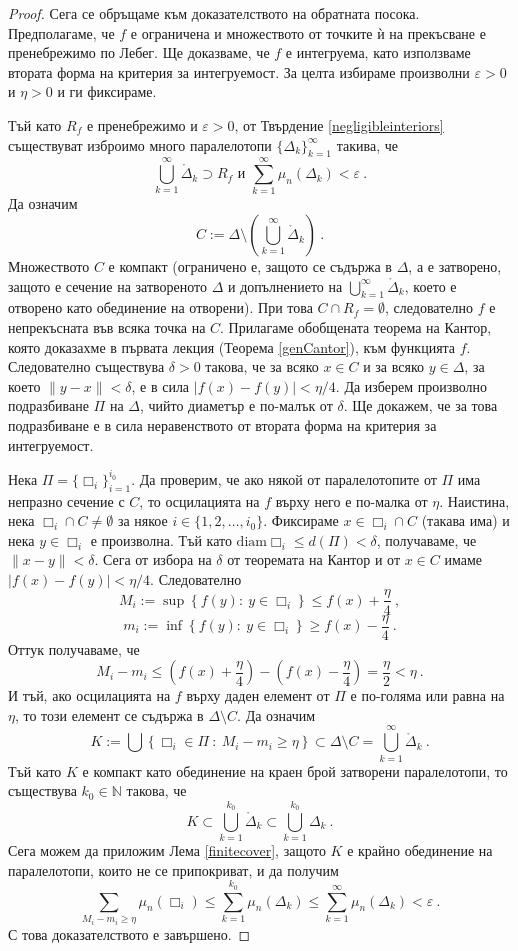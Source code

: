 \documentclass[11pt]{article}
\numberwithin{equation}{section}
\numberwithin{figure}{section}
\numberwithin{table}{section}
\theoremstyle{plain}
\theoremstyle{definition}
\theoremstyle{remark}
\theoremstyle{definition}
\theoremstyle{remark}
\theoremstyle{plain}
\theoremstyle{definition}
\theoremstyle{definition}
\theoremstyle{plain}
\theoremstyle{plain}
\theoremstyle{plain}
\theoremstyle{definition}
\theoremstyle{plain}
\newcommand*{\N}{\mathbb{N}}
\begin{document}
\begin{proof}
Сега се обръщаме към доказателството на обратната посока. Предполагаме, че $f$ е ограничена и множеството от точките \`{и} на прекъсване  е пренебрежимо по Лебег. Ще доказваме, че $f$ е интегруема, като използваме втората форма на критерия за интегруемост. За целта избираме произволни $\varepsilon>0$ и $\eta>0$ и ги фиксираме.

Тъй като $R_f$ е пренебрежимо и $\varepsilon>0$, от Твърдение \ref{negligibleinteriors} съществуват изброимо много паралелотопи $\{\Delta_k \}_{k=1}^\infty$ такива, че $$\bigcup_{k=1}^\infty \mathring\Delta_k \supset R_f  \mbox{ и } \sum_{k=1}^\infty \mu_n(\Delta_k)<\varepsilon \ .$$
Да означим
$$C := \Delta\setminus \left(\bigcup_{k=1}^\infty \mathring\Delta_k\right) \ .$$
Множеството $C$ е компакт (ограничено е, защото се съдържа в $\Delta$, а е затворено, защото е сечение на затвореното $\Delta$ и допълнението на $\bigcup_{k=1}^\infty \mathring\Delta_k$, което е отворено като обединение на отворени). При това $C\cap R_f=\emptyset$, следователно $f$ е непрекъсната във всяка точка на $C$. Прилагаме обобщената теорема на Кантор, която доказахме в първата лекция (Теорема \ref{genCantor}), към функцията $f$. Следователно съществува $\delta >0$ такова, че за всяко $x\in C$ и за всяко $y\in \Delta$, за което $\| y-x\|<\delta$, е в сила $|f(x)-f(y)|<\eta/4$. Да изберем произволно подразбиване $\Pi$ на $\Delta$, чийто диаметър е по-малък от $\delta$. Ще докажем, че за това подразбиване е в сила неравенството от втората форма на критерия за интегруемост.

Нека $\Pi=\{ \Box_i\}_{i=1}^{i_0}$. Да проверим, че ако някой от паралелотопите от $\Pi$ има непразно сечение с $C$, то осцилацията на $f$ върху него е по-малка от $\eta$. Наистина, нека $\Box_i \cap C\not =\emptyset$ за някое $i\in \{ 1,2,\dots ,i_0\}$. Фиксираме $x\in \Box_i \cap C$ (такава има) и нека $y\in \Box_i$ е произволна. Тъй като $\textrm{diam} \Box_i \le d(\Pi)<\delta$, получаваме, че $\| x-y\| <\delta$. Сега от избора на $\delta$ от теоремата на Кантор и от $x\in C$ имаме $|f(x)-f(y)|<\eta/4$. Следователно
$$M_i:=\sup \left\{ f(y): \ y\in \Box_i\right\} \le f(x)+\frac{\eta}{4} \ ,$$
$$m_i:=\inf \left\{ f(y): \ y\in \Box_i\right\} \ge f(x)-\frac{\eta}{4} \ .$$
Оттук получаваме, че 
$$M_i-m_i \le \left( f(x)+\frac{\eta}{4}\right)-\left( f(x)-\frac{\eta}{4}\right)=\frac{\eta}{2}<\eta \ .$$
И тъй, ако осцилацията на $f$ върху даден елемент от $\Pi$ е по-голяма или равна на $\eta$, то този елемент се съдържа в $\Delta\setminus C$. Да означим 
$$K:= \bigcup\left\{ \Box_i \in \Pi \ : \ M_i-m_i \ge \eta\right\} \subset \Delta\setminus C = \bigcup_{k=1}^\infty \mathring\Delta_k \ .$$
Тъй като $K$ е компакт като обединение на краен брой затворени паралелотопи, то съществува $k_0\in \N$ такова, че
$$K\subset \bigcup_{k=1}^{k_0} \mathring\Delta_k \subset\bigcup_{k=1}^{k_0} \Delta_k \ .$$
Сега можем да приложим Лема \ref{finitecover}, защото $K$ е крайно обединение на паралелотопи, които не се припокриват, и да получим
$$\sum_{M_i-m_i \ge \eta} \mu_n(\Box_i) \le \sum_{k=1}^{k_0} \mu_n(\Delta_k) \le \sum_{k=1}^\infty \mu_n(\Delta_k) < \varepsilon \ .$$
С това доказателството е завършено.
\end{proof}
\end{document}
